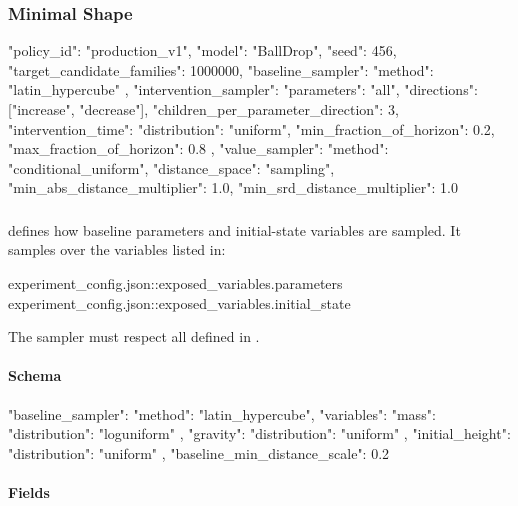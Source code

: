 \documentclass[11pt]{article}
\begin{document}
\subsubsection*{Minimal Shape}

\begin{DocCode}
{
  "policy_id": "production_v1",
  "model": "BallDrop",
  "seed": 456,
  "target_candidate_families": 1000000,
  "baseline_sampler": {
    "method": "latin_hypercube"
  },
  "intervention_sampler": {
    "parameters": "all",
    "directions": ["increase", "decrease"],
    "children_per_parameter_direction": 3,
    "intervention_time": {
      "distribution": "uniform",
      "min_fraction_of_horizon": 0.2,
      "max_fraction_of_horizon": 0.8
    },
    "value_sampler": {
      "method": "conditional_uniform",
      "distance_space": "sampling",
      "min_abs_distance_multiplier": 1.0,
      "min_srd_distance_multiplier": 1.0
    }
  }
}
\end{DocCode}

\subsubsection*{\texorpdfstring{}{baseline\_sampler}}

 defines how baseline parameters and initial-state variables are sampled.
It samples over the variables listed in:

\begin{DocCode}
experiment_config.json::exposed_variables.parameters
experiment_config.json::exposed_variables.initial_state
\end{DocCode}

The sampler must respect all  defined in .

\paragraph{Schema}

\begin{DocCode}
"baseline_sampler": {
  "method": "latin_hypercube",
  "variables": {
    "mass": {
      "distribution": "loguniform"
    },
    "gravity": {
      "distribution": "uniform"
    },
    "initial_height": {
      "distribution": "uniform"
    }
  },
  "baseline_min_distance_scale": 0.2
}
\end{DocCode}

\paragraph{Fields}
\end{document}
